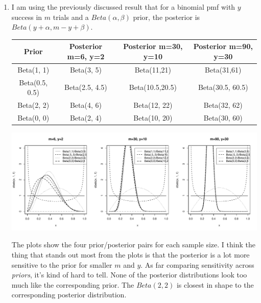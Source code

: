 \documentclass[12pt]{article}\usepackage[]{graphicx}\usepackage[]{color}
\newenvironment{knitrout}{}{} %
\begin{document}
\begin{doublespacing}
\begin{enumerate}
\begin{enumerate}
\end{enumerate}

\newpage

\item I am using the previously discussed result that for a binomial pmf with $y$ success in $m$ trials and a $Beta(\alpha, \beta)$ prior, the posterior is $Beta(y+\alpha, m-y+\beta)$. 


\begin{table}[!h]
\begin{tabular}{c|c|c|c}
Prior & Posterior m=6, y=2 & Posterior m=30, y=10 & Posterior m=90, y=30 \\
\hline
Beta(1, 1) & Beta(3, 5) &  Beta(11,21) & Beta(31,61)\\
Beta(0.5, 0.5) & Beta(2.5, 4.5) & Beta(10.5,20.5) & Beta(30.5, 60.5) \\
Beta(2, 2) & Beta(4, 6) & Beta(12, 22) & Beta(32, 62) \\
Beta(0, 0) & Beta(2, 4) & Beta(10, 20) & Beta(30, 60)
\end{tabular}
\end{table}


\begin{knitrout}\footnotesize
{}\color{fgcolor}
\includegraphics[width=\linewidth]{figure/plotbetaslast-1} 

\end{knitrout}

The plots show the four prior/posterior pairs for each sample size. I think the thing that stands out most from the plots is that the posterior is a lot more sensitive to the prior for smaller $m$ and $y$. As far comparing sensitivity across {\it priors}, it's kind of hard to tell. None of the posterior distributions look too much like the corresponding prior. The $Beta(2,2)$ is closest in shape to the corresponding posterior distribution.




\end{enumerate}
\end{doublespacing}
\end{document}
